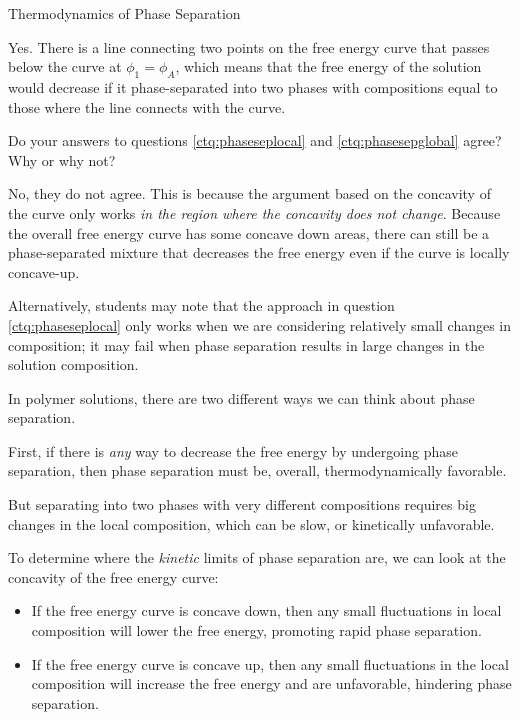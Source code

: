 \begin{activity}{Thermodynamics of Phase Separation}
\begin{ctqs}
			\begin{solution}[1.5in]{}
			
				Yes.  There is a line connecting two points on the free energy curve that passes below the curve at $\phi_1 = \phi_A$, which means that the free energy of the solution would decrease if it phase-separated into two phases with compositions equal to those where the line connects with the curve.
				
			\end{solution}
		
		\question Do your answers to questions \ref{ctq:phaseseplocal} and \ref{ctq:phasesepglobal} agree?  Why or why not?
		
			\begin{solution}[1.5in]{}
			
				No, they do not agree.  This is because the argument based on the concavity of the curve only works \emph{in the region where the concavity does not change}.  Because the overall free energy curve has some concave down areas, there can still be a phase-separated mixture that decreases the free energy even if the curve is locally concave-up.
				
				Alternatively, students may note that the approach in question \ref{ctq:phaseseplocal} only works when we are considering relatively small changes in composition; it may fail when phase separation results in large changes in the solution composition.
			
			\end{solution}
			
\end{ctqs}

\begin{infobox}
	In polymer solutions, there are two different ways we can think about phase separation.
	
	First, if there is \emph{any} way to decrease the free energy by undergoing phase separation, then phase separation must be, overall, thermodynamically favorable.
	
	But separating into two phases with very different compositions requires big changes in the local composition, which can be slow, or kinetically unfavorable.
	
	To determine where the \emph{kinetic} limits of phase separation are, we can look at the concavity of the free energy curve:
	\begin{itemize}
		\item If the free energy curve is concave down, then any small fluctuations in local composition will lower the free energy, promoting rapid phase separation.
		\item If the free energy curve is concave up, then any small fluctuations in the local composition will increase the free energy and are unfavorable, hindering phase separation.
	\end{itemize}
	

\end{infobox}
\end{activity}
